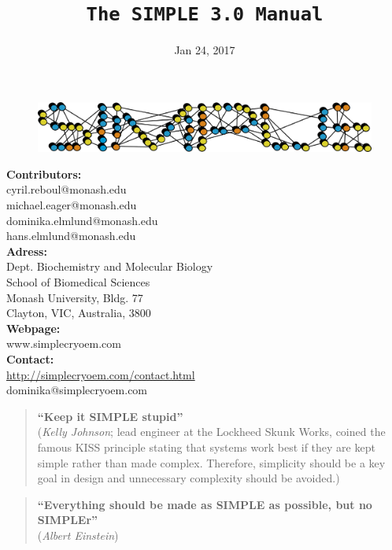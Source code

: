 \documentclass[a4paper,11pt]{article}
\newcommand{\prgname}[1]{\textcolor{NavyBlue}{\texttt{#1}}}
\begin{document}
\begin{figure}
\centering
\includegraphics[keepaspectratio=true,scale=0.6]{./SIMPLE_logo/rawlogo}
\end{figure}

\title{\prgname{The SIMPLE 3.0 Manual}}
\date{Jan 24, 2017}
\maketitle

\vspace{1em}
\begin{minipage}[ht]{0.48\textwidth}
\textbf{Contributors:}\\
cyril.reboul@monash.edu\\
michael.eager@monash.edu\\
dominika.elmlund@monash.edu\\
hans.elmlund@monash.edu\\
\textbf{Adress:}\\
Dept. Biochemistry and Molecular Biology\\
School of Biomedical Sciences\\
Monash University, Bldg. 77\\
Clayton, VIC, Australia, 3800\\
\textbf{Webpage:}\\
www.simplecryoem.com\\
\textbf{Contact:}\\
\url{http://simplecryoem.com/contact.html}\\
dominika@simplecryoem.com\\
\end{minipage}
\vspace{20pt}

\begin{quote}
\textbf{``Keep it SIMPLE stupid''}\\(\textit{Kelly Johnson}; lead engineer at the Lockheed Skunk Works, coined the famous KISS principle stating that systems work best if they are kept simple rather than made complex. Therefore, simplicity should be a key goal in design and unnecessary complexity should be avoided.)
\end{quote}

\begin{quote}
\textbf{``Everything should be made as SIMPLE as possible, but no SIMPLEr''}\\(\textit{Albert Einstein})
\end{quote}
\end{document}
